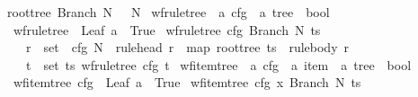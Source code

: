 \begin{isabellebody}
{\isacharbar}{\kern0pt}\ {\isachardoublequoteopen}root{\isacharunderscore}{\kern0pt}tree\ {\isacharparenleft}{\kern0pt}Branch\ N\ {\isacharunderscore}{\kern0pt}{\isacharparenright}{\kern0pt}\ {\isacharequal}{\kern0pt}\ N{\isachardoublequoteclose}\isanewline
\isanewline
{}\isamarkupfalse%
\ wf{\isacharunderscore}{\kern0pt}rule{\isacharunderscore}{\kern0pt}tree\ {\isacharcolon}{\kern0pt}{\isacharcolon}{\kern0pt}\ {\isachardoublequoteopen}{\isacharprime}{\kern0pt}a\ cfg\ {\isasymRightarrow}\ {\isacharprime}{\kern0pt}a\ tree\ {\isasymRightarrow}\ bool{\isachardoublequoteclose}\ \isanewline
\ \ {\isachardoublequoteopen}wf{\isacharunderscore}{\kern0pt}rule{\isacharunderscore}{\kern0pt}tree\ {\isacharunderscore}{\kern0pt}\ {\isacharparenleft}{\kern0pt}Leaf\ a{\isacharparenright}{\kern0pt}\ {\isasymlongleftrightarrow}\ True{\isachardoublequoteclose}\isanewline
{\isacharbar}{\kern0pt}\ {\isachardoublequoteopen}wf{\isacharunderscore}{\kern0pt}rule{\isacharunderscore}{\kern0pt}tree\ cfg\ {\isacharparenleft}{\kern0pt}Branch\ N\ ts{\isacharparenright}{\kern0pt}\ {\isasymlongleftrightarrow}\ {\isacharparenleft}{\kern0pt}\isanewline
\ \ \ \ {\isacharparenleft}{\kern0pt}{\isasymexists}r\ {\isasymin}\ set\ {\isacharparenleft}{\kern0pt}{\isasymRR}\ cfg{\isacharparenright}{\kern0pt}{\isachardot}{\kern0pt}\ N\ {\isacharequal}{\kern0pt}\ rule{\isacharunderscore}{\kern0pt}head\ r\ {\isasymand}\ map\ root{\isacharunderscore}{\kern0pt}tree\ ts\ {\isacharequal}{\kern0pt}\ rule{\isacharunderscore}{\kern0pt}body\ r{\isacharparenright}{\kern0pt}\ {\isasymand}\isanewline
\ \ \ \ {\isacharparenleft}{\kern0pt}{\isasymforall}t\ {\isasymin}\ set\ ts{\isachardot}{\kern0pt}\ wf{\isacharunderscore}{\kern0pt}rule{\isacharunderscore}{\kern0pt}tree\ cfg\ t{\isacharparenright}{\kern0pt}{\isacharparenright}{\kern0pt}{\isachardoublequoteclose}\isanewline
\isanewline
{}\isamarkupfalse%
\ wf{\isacharunderscore}{\kern0pt}item{\isacharunderscore}{\kern0pt}tree\ {\isacharcolon}{\kern0pt}{\isacharcolon}{\kern0pt}\ {\isachardoublequoteopen}{\isacharprime}{\kern0pt}a\ cfg\ {\isasymRightarrow}\ {\isacharprime}{\kern0pt}a\ item\ {\isasymRightarrow}\ {\isacharprime}{\kern0pt}a\ tree\ {\isasymRightarrow}\ bool{\isachardoublequoteclose}\ \isanewline
\ \ {\isachardoublequoteopen}wf{\isacharunderscore}{\kern0pt}item{\isacharunderscore}{\kern0pt}tree\ cfg\ {\isacharunderscore}{\kern0pt}\ {\isacharparenleft}{\kern0pt}Leaf\ a{\isacharparenright}{\kern0pt}\ {\isasymlongleftrightarrow}\ True{\isachardoublequoteclose}\isanewline
{\isacharbar}{\kern0pt}\ {\isachardoublequoteopen}wf{\isacharunderscore}{\kern0pt}item{\isacharunderscore}{\kern0pt}tree\ cfg\ x\ {\isacharparenleft}{\kern0pt}Branch\ N\ ts{\isacharparenright}{\kern0pt}\ {\isasymlongleftrightarrow}\ {\isacharparenleft}{\kern0pt}\isanewline

\end{isabellebody}
